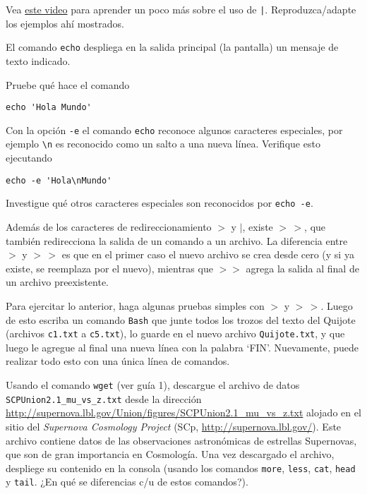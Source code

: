 \documentclass[11pt]{exam}
\begin{document}
\begin{questions}


\item Vea \href{https://youtu.be/VSH1XpWN1us}{este video} para aprender un poco más sobre el uso de \texttt{|}. Reproduzca/adapte los ejemplos ahí mostrados.

\item El comando \texttt{echo} despliega en la salida principal (la pantalla) un mensaje de texto indicado.
\begin{parts}
\item Pruebe qué hace el comando 
\begin{verbatim}
echo 'Hola Mundo'
\end{verbatim}
\item Con la opción \texttt{-e} el comando \texttt{echo} reconoce algunos caracteres especiales, por ejemplo \verb|\n| es reconocido como un salto a una nueva línea. Verifique esto ejecutando
\begin{verbatim}
echo -e 'Hola\nMundo'
\end{verbatim}
\item Investigue qué otros caracteres especiales son reconocidos por \texttt{echo -e}.
\end{parts}

\item Además de los caracteres de redireccionamiento $>$ y $\vert$, existe $>\,>$, que también redirecciona la salida de un comando a un archivo. La diferencia entre $>$ y $>\,>$ es que en el primer caso el nuevo archivo se crea desde cero (y si ya existe, se reemplaza por el nuevo), mientras que $>>$ agrega la salida al final de un archivo preexistente.

Para ejercitar lo anterior, haga algunas pruebas simples con $>$ y $>\,>$. Luego de esto escriba un comando \texttt{Bash} que junte todos los trozos del texto del Quijote (archivos \texttt{c1.txt} a \texttt{c5.txt}), lo guarde en el nuevo archivo \texttt{Quijote.txt},   y que luego le agregue al final una nueva línea con la palabra `FIN'. Nuevamente, puede realizar todo esto con una única línea de comandos.

\item Usando el comando \texttt{wget} (ver guía 1), descargue el archivo de datos \verb|SCPUnion2.1_mu_vs_z.txt| desde la dirección \url{http://supernova.lbl.gov/Union/figures/SCPUnion2.1_mu_vs_z.txt} alojado en el sitio del \textit{Supernova Cosmology Project} (SCp,
\url{http://supernova.lbl.gov/}). Este archivo contiene datos de las observaciones astronómicas de estrellas Supernovas, que son de gran importancia en Cosmología. Una vez descargado el archivo, despliege su contenido en la consola (usando los comandos \texttt{more}, \texttt{less}, \texttt{cat}, \texttt{head} y \texttt{tail}. ¿En qué se diferencias c/u de estos comandos?).


\end{questions}
\end{document}
